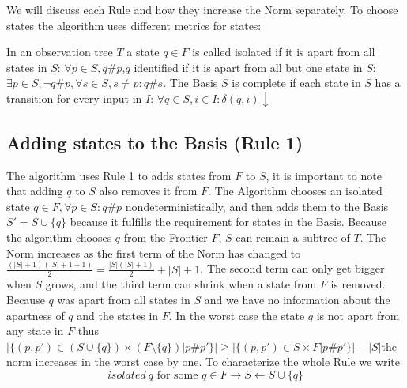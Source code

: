 We will discuss each Rule and how they increase the Norm separately. 
To choose states the algorithm uses different metrics for states:
\begin{definition}\label{def:isolated}
	In an observation tree $T$ a state $q\in F$ is called isolated if it is apart from all states in $S$: $\forall p\in S, q\#p$,$q$ identified if it is apart from all but one state in $S$: $\exists p\in S, \neg q\#p, \forall s\in S, s\neq p: q\#s$. The Basis $S$ is complete if each state in $S$ has a transition for every input in $I$: $\forall q\in S, i\in I: \delta(q,i)\downarrow$
\end{definition}

\subsection{Adding states to the Basis (Rule 1)}

The algorithm uses Rule 1 to adds states from $F$ to $S$, it is important to note that adding $q$ to $S$ also removes it from $F$. 
 The Algorithm chooses an isolated state $q\in F, \forall p\in S: q\#p$ nondeterministically, and then adds them to the Basis $S'=S\cup\{q\}$ because it fulfills the requirement for states in the Basis. Because the algorithm chooses $q$ from the Frontier $F$, $S$ can remain a subtree of $T$. The Norm increases as the first term of the Norm has changed to $\frac{(|S|+1)(|S|+1+1)}{2}=\frac{|S|(|S|+1)}{2}+|S|+1$. The second term can only get bigger when $S$ grows, and the third term can shrink when a state from $F$ is removed. Because $q$ was apart from all states in $S$ and we have no information about the apartness of $q$ and the states in $F$. In the worst case the state $q$ is not apart from any state in $F$ thus $|\{(p,p')\in (S\cup \{q\})\times (F\setminus \{q\})| p\#p'\}|\geq |\{(p,p')\in S\times F| p\#p'\}|-|S|$the norm increases in the worst case by one. To characterize the whole Rule we write $$
isolated\: q \text{ for some } q\in F \rightarrow S\leftarrow S\cup\{q\}
$$ 

